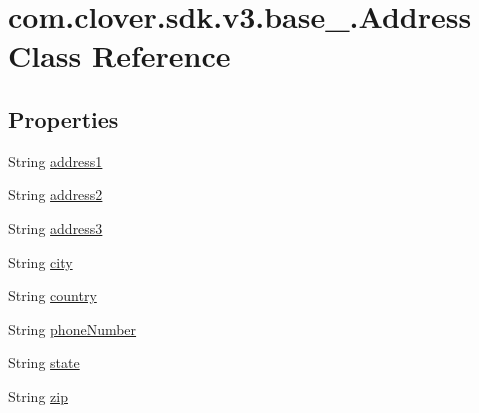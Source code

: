 \hypertarget{classcom_1_1clover_1_1sdk_1_1v3_1_1base___1_1_address}{}\section{com.\+clover.\+sdk.\+v3.\+base\+\_\+.\+Address Class Reference}
\label{classcom_1_1clover_1_1sdk_1_1v3_1_1base___1_1_address}
\subsection*{Properties}
\begin{DoxyCompactItemize}
\item 
String \hyperlink{classcom_1_1clover_1_1sdk_1_1v3_1_1base___1_1_address_a497b7c55ff38db65464744f197220fc1}{address1}
\item 
String \hyperlink{classcom_1_1clover_1_1sdk_1_1v3_1_1base___1_1_address_aa1f8a5d5d5939ef3306ab9d7f3ef3484}{address2}
\item 
String \hyperlink{classcom_1_1clover_1_1sdk_1_1v3_1_1base___1_1_address_aa904055629ff84a30ca09e1365cb81d7}{address3}
\item 
String \hyperlink{classcom_1_1clover_1_1sdk_1_1v3_1_1base___1_1_address_a19f76bc784d6af732735688b1b6d25a1}{city}
\item 
String \hyperlink{classcom_1_1clover_1_1sdk_1_1v3_1_1base___1_1_address_a6853ff5136eb1094dbbc7e15d74ae069}{country}
\item 
String \hyperlink{classcom_1_1clover_1_1sdk_1_1v3_1_1base___1_1_address_a2ea129ee31e4e2f6305cba3dcb050952}{phone\+Number}
\item 
String \hyperlink{classcom_1_1clover_1_1sdk_1_1v3_1_1base___1_1_address_ae698fc4f47947a0b6bd926c03675e624}{state}
\item 
String \hyperlink{classcom_1_1clover_1_1sdk_1_1v3_1_1base___1_1_address_a27730d0ec203f67330094e43d9ab4fb4}{zip}
\end{DoxyCompactItemize}


